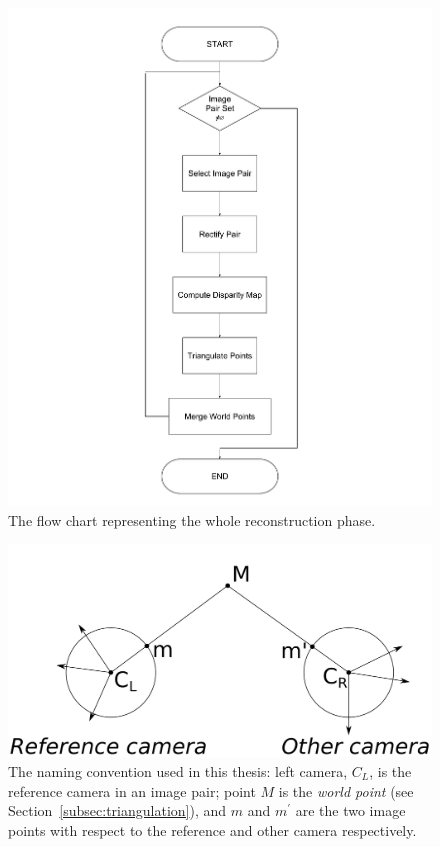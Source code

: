 \begin{figure}
	\centering
	\includegraphics[width=\linewidth]{img/densification_fc.pdf}
	\caption{The flow chart representing the whole reconstruction phase.}
	\label{fig:densification_fc}
\end{figure}

\begin{figure}
	\centering
	\includegraphics[width=\linewidth]{img/naming_convention.pdf}
	\caption{The naming convention used in this thesis: left camera, $C_L$,
	is the reference camera in an image pair; point $M$ is the
	\emph{world point} (see Section~\ref{subsec:triangulation}),
	and $m$ and $m^\prime$ are the two image points with respect to
	the reference and other camera respectively.}
	\label{fig:naming_convention}
\end{figure}
%

